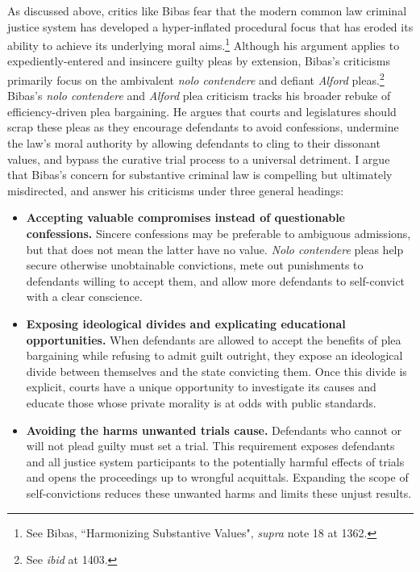 As discussed above, critics like Bibas fear that the modern common law criminal justice system has developed a hyper-inflated procedural focus that has eroded its ability to achieve its underlying moral aims.\footnote{See Bibas, ``Harmonizing Substantive Values", \textit{supra} note 18 at 1362.} Although his argument applies to expediently-entered and insincere guilty pleas by extension, Bibas's criticisms primarily focus on the ambivalent \textit{nolo contendere} and defiant \textit{Alford} pleas.\footnote{See \textit{ibid} at 1403.} Bibas's \textit{nolo contendere} and \textit{Alford} plea criticism tracks his broader rebuke of efficiency-driven plea bargaining. He argues that courts and legislatures should scrap these pleas as they encourage defendants to avoid confessions, undermine the law's moral authority by allowing defendants to cling to their dissonant values, and bypass the curative trial process to a universal detriment. I argue that Bibas's concern for substantive criminal law is compelling but ultimately misdirected, and answer his criticisms under three general headings:

\begin{itemize}
    \item \textbf{Accepting valuable compromises instead of questionable confessions.} Sincere confessions may be preferable to ambiguous admissions, but that does not mean the latter have no value. \textit{Nolo contendere} pleas help secure otherwise unobtainable convictions, mete out punishments to defendants willing to accept them, and allow more defendants to self-convict with a clear conscience.
    \item \textbf{Exposing ideological divides and explicating educational opportunities.} When defendants are allowed to accept the benefits of plea bargaining while refusing to admit guilt outright, they expose an ideological divide between themselves and the state convicting them. Once this divide is explicit, courts have a unique opportunity to investigate its causes and educate those whose private morality is at odds with public standards.
    \item \textbf{Avoiding the harms unwanted trials cause.} Defendants who cannot or will not plead guilty must set a trial. This requirement exposes defendants and all justice system participants to the potentially harmful effects of trials and opens the proceedings up to wrongful acquittals. Expanding the scope of self-convictions reduces these unwanted harms and limits these unjust results.
\end{itemize}

